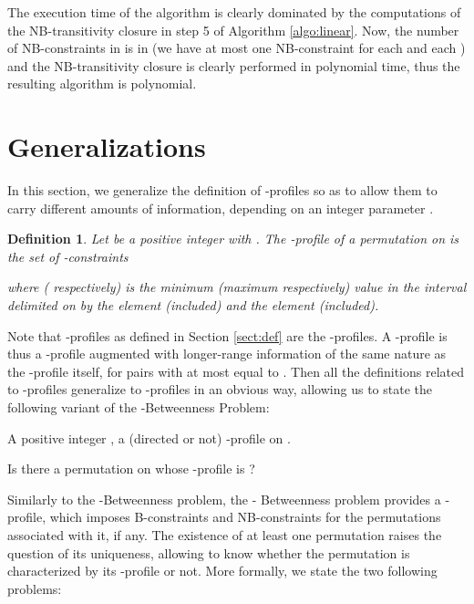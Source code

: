 \documentclass{article}
\newtheorem{defin}{Definition}
\newcommand{\bdefin}{\begin{defin}\rm}
\newcommand{\edefin}{\end{defin} }
\begin{document}
The execution time of the algorithm is clearly dominated by the  computations of
the NB-transitivity closure in step 5 of Algorithm \ref{algo:linear}. Now, the number
of NB-constraints in  is in  (we have at most one NB-constraint  for each
 and each ) and the NB-transitivity closure is clearly performed in polynomial time,
thus the resulting algorithm is polynomial.  
 

\section{Generalizations}\label{sect:Generalizations}

In this section, we generalize the definition of -profiles so as to allow
them to carry different amounts of information, depending on an integer parameter .

\bdefin
Let  be a positive integer with . The {\em -profile of a permutation}  on  
is the set of {\em -constraints}



\noindent where  ( respectively) is the minimum (maximum respectively) value 
in the interval delimited on  by the element  (included) and the element  (included). 
\edefin

 
Note that -profiles as defined in Section \ref{sect:def} are the -profiles.
A -profile is thus a -profile augmented with longer-range information of the same
nature as the -profile itself,  for pairs  with  at most equal to .
Then all the definitions  related to -profiles generalize to -profiles in an obvious way,
allowing us to state the following variant of the -Betweenness Problem:

\bigskip


 A positive integer , a (directed or not) -profile  on . 

 Is there a permutation  on  whose -profile is ? 
\bigskip

Similarly to the -{\sc Betweenness} problem, the  - {\sc Betweenness} problem provides a -profile,
which imposes B-constraints and NB-constraints for the permutations associated with it, if any. 
The existence of at least one permutation raises the question of its uniqueness,
allowing to know whether the permutation is characterized by its -profile or not.
More formally, we state the two following problems:

\bigskip
\end{document}
